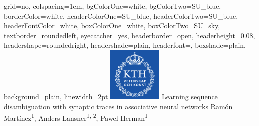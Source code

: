 \documentclass[landscape , a0, final]{baposter}
\begin{document}

\newlength{\leftimgwidth}
\begin{poster}%
  {
  grid=no,
  colspacing=1em,
  bgColorOne=white,
  bgColorTwo=SU_blue,
  borderColor=white,
  headerColorOne=SU_blue,
  headerColorTwo=SU_blue,
  headerFontColor=white,
  boxColorOne=white, %
  boxColorTwo=SU_sky,
  textborder=roundedleft,
  eyecatcher=yes,
  headerborder=open,
  headerheight=0.08\textheight,
  headershape=roundedright,
  headershade=plain,
  headerfont=\Large\textsf, %
  boxshade=plain,
  background=plain,
  linewidth=2pt
  }
  {\includegraphics[height=7em]{Kth_logo2.png}} %
  {\sf %
  \color{black} Learning sequence disambiguation with synaptic traces in associative neural networks}
  {\sf %
  \vspace{-0.2em}
  \color{SU_fire} Ram{\'o}n Mart{\'i}nez\textsuperscript{1},  Anders Lansner\textsuperscript{1, 2}, Pawel Herman\textsuperscript{1}\\ 
  \color{black}
  }
  {%
  }


\end{poster}
\end{document}
